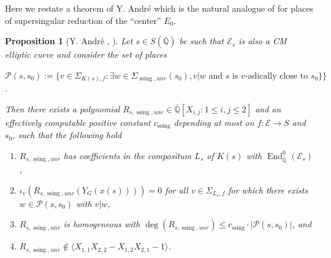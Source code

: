 \documentclass[12pt,twoside,a4paper]{article}
\theoremstyle{plain}%
\newtheorem{prop}[theorem]{Proposition}
\DeclareMathOperator{\End}{End}
\DeclareMathOperator{\ssing}{ssing}
\newcommand{\Q}{\mathbb{Q}}
\newcommand{\CE}{\mathcal{E}}
\newcommand{\CP}{\mathcal{P}}
\newcommand{\unr}{unr}
\begin{document}
Here we restate a theorem of Y. Andr\'e which is the natural analogue of  for places of supersingular reduction of the ``center'' $E_0$. 
\begin{prop}[Y. Andr\'e \cite{andremots}, \cite{andremsj}]\label{propandresupercm}
	Let $s\in S(\bar{\Q})$ be such that $\CE_s$ is also a CM elliptic curve and consider the set of places \begin{center}
		 $\CP(s,s_0):=\{v\in \Sigma_{K(s),f}:\exists w\in\Sigma_{\ssing,\unr}(s_0), v|w \text{ and } s \text{ is }v\text{-adically close to }s_0\}\}$.
\end{center}
	
	Then there exists a polynomial $R_{s,\ssing,\unr}\in \bar{\Q}[X_{i,j}:1\leq i,j\leq 2]$ and an effectively computable positive constant $c_{\ssing}$ depending at most on $f:\CE\rightarrow S$ and $s_0$, such that the following hold
	\begin{enumerate}
		\item $R_{s,\ssing,\unr}$ has coefficients in the compositum $L_s$ of $K(s)$ with $\End_{\bar{\Q}}^{0}(\CE_s)$,
		
		\item $\iota_v(R_{s,\ssing,\unr}(Y_G(x(s))))=0$ for all $v\in\Sigma_{L_s,f}$ for which there exists $w\in\CP(s,s_0)$ with $v|w$, 
		
		\item $R_{s,\ssing,\unr}$ is homogeneous with $\deg(R_{s,\ssing,\unr})\leq c_{\ssing}\cdot|\CP(s,s_0)|$, and 
		
		\item $R_{s,\ssing,\unr}\notin \langle X_{1,1}X_{2,2}-X_{1,2}X_{2,1}-1 \rangle $.
	\end{enumerate}\end{prop}
\end{document}
